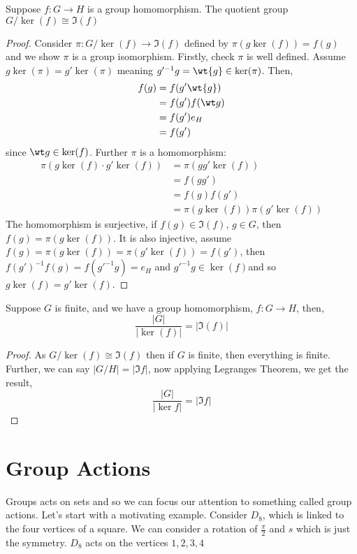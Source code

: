 \begin{nthm}
  Suppose $f : G \to H$ is a group homomorphism. The quotient group $G/\ker(f)\cong \Im(f)$
\end{nthm}
\begin{proof}
  Consider $\pi : G/\ker(f) \to \Im(f)$ defined by $\pi(g\ker(f)) = f(g)$ and we show $\pi$ is a group isomorphism. Firstly, check $\pi$ is well defined. Assume $g\ker(\pi) = g'\ker(\pi)$ meaning $g'^{-1}g = \wt{g} \in \ker(\pi)$. Then,
  \begin{align*}
    f(g) &= f(g'\wt{g})\\
    &= f(g')f(\wt g)\\
    &= f(g')e_H\\
    &= f(g')
  \end{align*}
  since $\wt g \in \ker (f)$. Further $\pi$ is a homomorphism:
  \begin{align*}
    \pi(g\ker(f) \cdot g'\ker(f)) &= \pi(gg'\ker(f))\\
    &= f(gg')\\
    &= f(g)f(g')\\
    &= \pi(g\ker (f))\pi(g'\ker (f))
  \end{align*}
  The homomorphism is surjective, if $f(g) \in \Im(f)$, $g \in G$, then $f(g) = \pi(g\ker (f))$. It is also injective, assume $f(g) = \pi(g\ker(f)) = \pi(g'\ker (f)) = f(g')$, then $f(g')^{-1}f(g) = f(g'^{-1}g) = e_H$  and $g'^{-1}g \in \ker(f)$and so $g\ker(f) = g'\ker(f)$.
\end{proof}

\begin{ncor}
   Suppose $G$ is finite, and we have a group homomorphism, $f: G \to H$, then,
   $$ \frac{|G|}{|\ker (f)|} = |\Im(f)| $$
\end{ncor}
\begin{proof}
  As $G/\ker(f)\cong \Im(f)$ then if $G$ is finite, then everything is finite. Further, we can say $|G/H| = |\Im f|$, now applying Legranges Theorem, we get the result,
  $$ \frac{|G|}{|\ker f|} = |\Im f| $$
\end{proof}

\section{Group Actions}
Groups acts on sets and so we can focus our attention to something called group actions. Let's start with a motivating example. Consider $D_8$, which is linked to the four vertices of a square. We can consider a rotation of $\frac{\pi }{2}$ and $s$ which is just the symmetry. $D_8$ acts on the vertices $1, 2, 3, 4$

